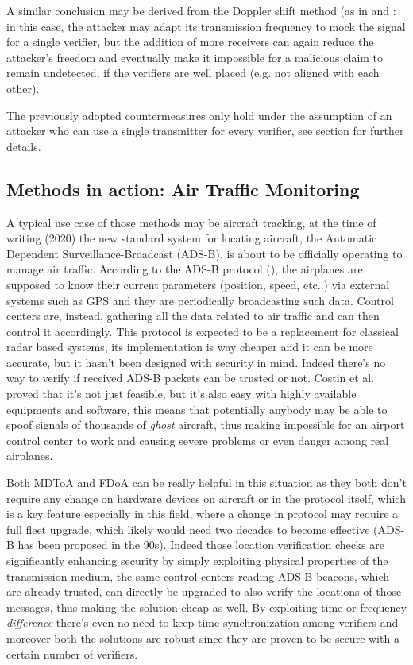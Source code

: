 \documentclass[conference]{IEEEtran}
\begin{document}
A similar conclusion may be derived from the Doppler shift method (as in \cite{schaefer16} and \cite{ghose15}: in this case, the attacker may adapt its transmission frequency to mock the signal for a single verifier, but the addition of more receivers can again reduce the attacker's freedom and eventually make it impossible for a malicious claim to remain undetected, if the verifiers are well placed (e.g. not aligned with each other).

The previously adopted countermeasures only hold under the assumption of an attacker who can use a single transmitter for every verifier, see section %
for further details.

\subsection{Methods in action: Air Traffic Monitoring}

A typical use case of those methods may be aircraft tracking, at the time of writing (2020) the new standard system for locating aircraft, the Automatic Dependent Surveillance-Broadcast (ADS-B), is about to be officially operating to manage air traffic. According to the ADS-B protocol (\cite{adsb}), the airplanes are supposed to know their current parameters (position, speed, etc..) via external systems such as GPS and they are periodically broadcasting such data. Control centers are, instead, gathering all the data related to air traffic and can then control it accordingly. This protocol is expected to be a replacement for classical radar based systems, its implementation is way cheaper and it can be more accurate, but it hasn't been designed with security in mind. Indeed there's no way to verify if received ADS-B packets can be trusted or not.
Costin et al. \cite{costin12} proved that it's not just feasible, but it's also easy with highly available equipments and software, this means that potentially anybody may be able to spoof signals of thousands of \textit{ghost} aircraft, thus making impossible for an airport control center to work and causing severe problems or even danger among real airplanes.

Both MDToA and FDoA can be really helpful in this situation as they both don't require any change on hardware devices on aircraft or in the protocol itself, which is a key feature especially in this field, where a change in protocol may require a full fleet upgrade, which likely would need two decades to become effective (ADS-B has been proposed in the 90s). Indeed those location verification checks are significantly enhancing security by simply exploiting physical properties of the transmission medium, the same control centers reading ADS-B beacons, which are already trusted, can directly be upgraded to also verify the locations of those messages, thus making the solution cheap as well. By exploiting time or frequency \textit{difference} there's even no need to keep time synchronization among verifiers and moreover both the solutions are robust since they are proven to be secure with a certain number of verifiers.
\end{document}
